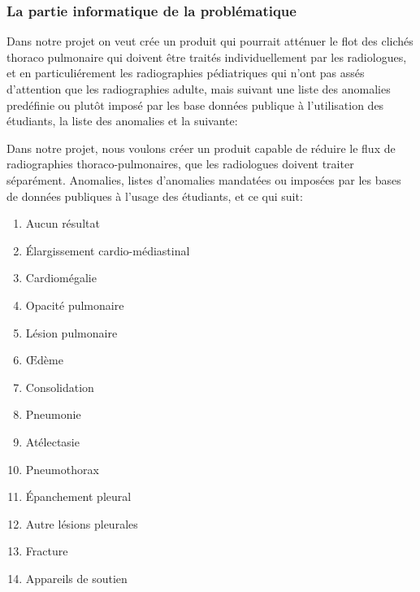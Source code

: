             \subsubsection{La partie informatique de la problématique}\label{partie_info}
                Dans notre projet on veut crée un produit qui pourrait atténuer le flot des clichés thoraco pulmonaire qui doivent être traités individuellement par les radiologues, et en particuliérement les radiographies pédiatriques qui n'ont pas assés d'attention que les radiographies adulte, mais suivant une liste des anomalies predéfinie ou plutôt imposé par les base données publique à l'utilisation des étudiants, la liste des anomalies et la suivante:

                Dans notre projet, nous voulons créer un produit capable de réduire le flux de radiographies thoraco-pulmonaires, que les radiologues doivent traiter séparément. Anomalies, listes d'anomalies mandatées ou imposées par les bases de données publiques à l'usage des étudiants,  et ce qui suit:
                \begin{multicols}{2}\label{list_dia}
                    \begin{enumerate}
                        \item Aucun résultat
                        \item Élargissement cardio-médiastinal
                        \item Cardiomégalie
                        \item Opacité pulmonaire
                        \item Lésion pulmonaire
                        \item Œdème
                        \item Consolidation
                        \item Pneumonie
                        \item Atélectasie
                        \item Pneumothorax
                        \item Épanchement pleural
                        \item Autre lésions pleurales 
                        \item Fracture
                        \item Appareils de soutien
                    \end{enumerate}
                \end{multicols}

